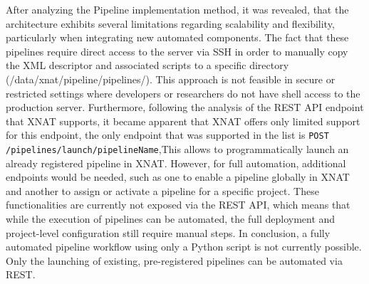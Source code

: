 After analyzing the Pipeline implementation method, it was revealed, that the architecture exhibits several limitations regarding scalability and flexibility, particularly when integrating new automated components.
The fact that these pipelines require direct access to the server via SSH in order to manually copy the XML
descriptor and associated scripts to a specific directory (/data/xnat/pipeline/pipelines/). This approach is not
feasible in secure or restricted settings where developers or researchers do not have shell access to the production
server. Furthermore, following the analysis of the REST API endpoint that XNAT supports, it became apparent that XNAT offers only limited support for this endpoint, the only endpoint that was supported in the list is \texttt{POST /pipelines/launch/{pipelineName}},This allows to programmatically launch an already registered pipeline in XNAT.  However, for full
automation, additional endpoints would be needed, such as one to enable a pipeline globally in XNAT and
another to assign or activate a pipeline for a specific project. These functionalities are currently not exposed via
the REST API, which means that while the execution of pipelines can be automated, the full deployment and
project-level configuration still require manual steps.
In conclusion, a fully automated pipeline workflow using only a Python script is not currently possible.
Only the launching of existing, pre-registered pipelines can be automated via REST.
